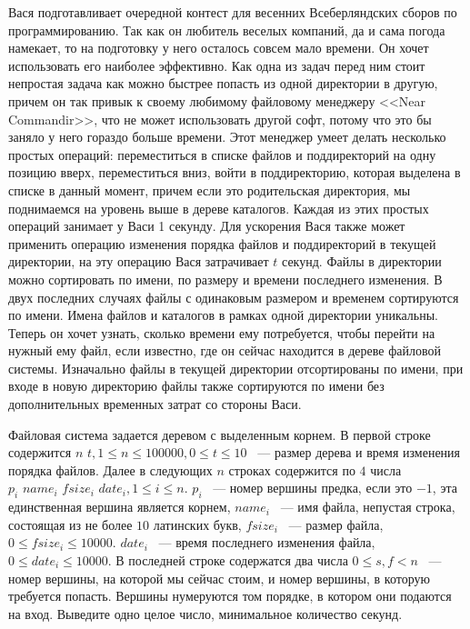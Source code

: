Вася подготавливает очередной контест для весенних
Всеберляндских сборов по программированию. Так как
он любитель веселых компаний, да и сама погода
намекает, то на подготовку у него осталось совсем мало времени.
Он хочет использовать его наиболее эффективно. Как одна из задач
перед ним стоит непростая задача как можно быстрее попасть
из одной директории в другую, причем он так привык к своему
любимому файловому менеджеру <<Near Commandir>>, что не может
использовать другой софт, потому что это бы заняло у него
гораздо больше времени. Этот менеджер умеет делать
несколько простых операций: переместиться в списке файлов и поддиректорий
на одну позицию вверх, переместиться вниз, войти в поддиректорию,
которая выделена в списке в данный момент, причем если это родительская
директория, мы поднимаемся на уровень выше в дереве каталогов.
Каждая из этих простых операций занимает у Васи 1 секунду.
Для ускорения Вася также может применить операцию изменения порядка файлов
и поддиректорий в текущей директории, на эту операцию Вася затрачивает $t$
секунд. Файлы в директории можно сортировать по имени,
по размеру и времени последнего изменения. В двух последних
случаях файлы с одинаковым размером и временем сортируются по имени.
Имена файлов и каталогов в рамках одной директории уникальны.
Теперь он хочет узнать, сколько времени ему потребуется,
чтобы перейти на нужный ему файл, если известно, где он сейчас
находится в дереве файловой системы. Изначально файлы в текущей директории
отсортированы по имени, при входе в новую директорию файлы
также сортируются по имени без дополнительных временных затрат
со стороны Васи.

\InputFile
Файловая система задается деревом с выделенным корнем. В первой строке
содержится $n \,\, t, 1 \le n \le 100000, 0 \le t \le 10$
~--- размер дерева и время изменения порядка файлов. Далее в следующих
$n$ строках содержится по $4$ числа
$p_i \,\, name_i \,\, fsize_i \,\, date_i, 1\le i \le n$.
$p_i$ ~--- номер вершины предка, если это $-1$, эта единственная вершина
является корнем, $name_i$ ~--- имя файла, непустая строка,
состоящая из не более $10$ латинских букв, $fsize_i$ ~--- размер файла,
$0 \le fsize_i \le 10000$.
$date_i$ ~--- время последнего изменения файла, $0 \le date_i \le 10000$.
В последней строке содержатся два числа $0 \le s, f < n$ ~---
номер вершины, на которой мы сейчас стоим, и номер вершины, в которую
требуется попасть. Вершины нумеруются том порядке,
в котором они подаются на вход.
\OutputFile
Выведите одно целое число, минимальное количество секунд.

